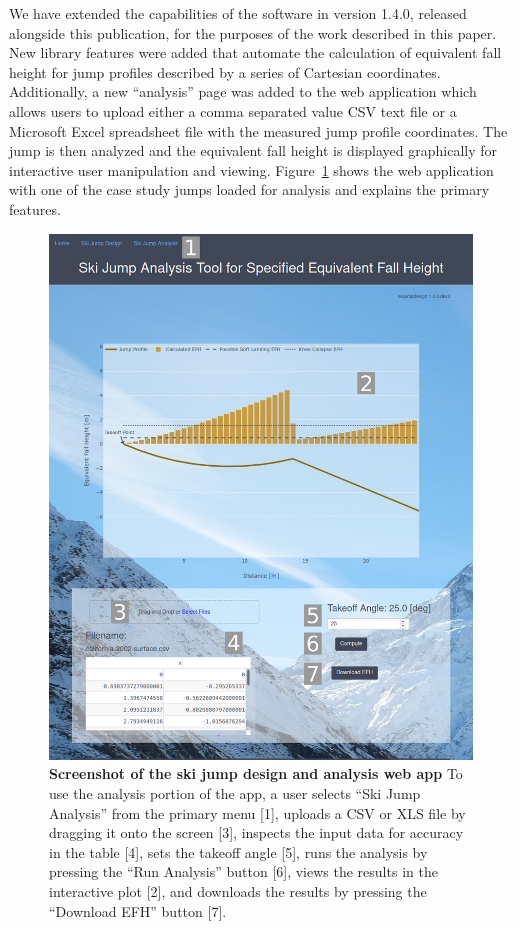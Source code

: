 \documentclass[smallextended]{svjour3}       %
\begin{document}
We have extended the capabilities of the software in version 1.4.0, released
alongside this publication, for the purposes of the work described in this
paper. New library features were added that automate the calculation of
equivalent fall height for jump profiles described by a series of Cartesian
coordinates. Additionally, a new ``analysis'' page was added to the web
application which allows users to upload either a comma separated value CSV
text file or a Microsoft Excel spreadsheet file with the measured jump profile
coordinates. The jump is then analyzed and the equivalent fall height is
displayed graphically for interactive user manipulation and viewing.
Figure~\ref{fig:web-app-screenshot} shows the web application with one of the
case study jumps loaded for analysis and explains the primary features.
%
\begin{figure}
  \centering
  \includegraphics[width=5.00in]{figures/web-app-screenshot.png}
  \caption{\textbf{Screenshot of the ski jump design and analysis web app} To
    use the analysis portion of the app, a user selects ``Ski Jump Analysis''
    from the primary menu [1], uploads a CSV or XLS file by dragging it onto
    the screen [3], inspects the input data for accuracy in the table [4], sets
    the takeoff angle [5], runs the analysis by pressing the ``Run Analysis''
    button [6], views the results in the interactive plot [2], and downloads
    the results by pressing the ``Download EFH'' button [7].}
  \label{fig:web-app-screenshot}
\end{figure}
\end{document}
